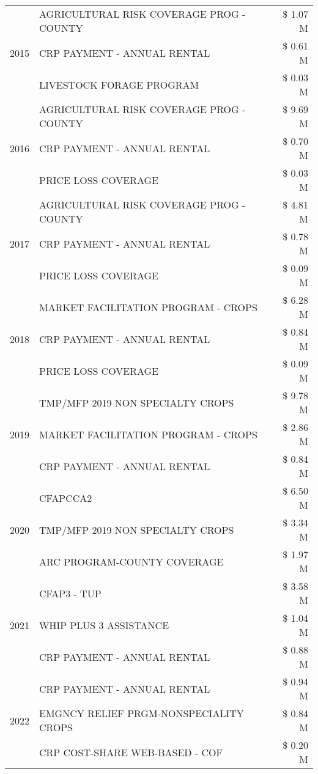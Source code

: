 \begin{tabular}{llr}
\multirow[t]{3}{*}{2015} & AGRICULTURAL RISK COVERAGE PROG - COUNTY & \$ 1.07 M \\
 & CRP PAYMENT - ANNUAL RENTAL & \$ 0.61 M \\
 & LIVESTOCK FORAGE PROGRAM & \$ 0.03 M \\
\cline{1-3}
\multirow[t]{3}{*}{2016} & AGRICULTURAL RISK COVERAGE PROG - COUNTY & \$ 9.69 M \\
 & CRP PAYMENT - ANNUAL RENTAL & \$ 0.70 M \\
 & PRICE LOSS COVERAGE & \$ 0.03 M \\
\cline{1-3}
\multirow[t]{3}{*}{2017} & AGRICULTURAL RISK COVERAGE PROG - COUNTY & \$ 4.81 M \\
 & CRP PAYMENT - ANNUAL RENTAL & \$ 0.78 M \\
 & PRICE LOSS COVERAGE & \$ 0.09 M \\
\cline{1-3}
\multirow[t]{3}{*}{2018} & MARKET FACILITATION PROGRAM - CROPS & \$ 6.28 M \\
 & CRP PAYMENT - ANNUAL RENTAL & \$ 0.84 M \\
 & PRICE LOSS COVERAGE & \$ 0.09 M \\
\cline{1-3}
\multirow[t]{3}{*}{2019} & TMP/MFP 2019 NON SPECIALTY CROPS & \$ 9.78 M \\
 & MARKET FACILITATION PROGRAM - CROPS & \$ 2.86 M \\
 & CRP PAYMENT - ANNUAL RENTAL & \$ 0.84 M \\
\cline{1-3}
\multirow[t]{3}{*}{2020} & CFAPCCA2 & \$ 6.50 M \\
 & TMP/MFP 2019 NON SPECIALTY CROPS & \$ 3.34 M \\
 & ARC PROGRAM-COUNTY COVERAGE & \$ 1.97 M \\
\cline{1-3}
\multirow[t]{3}{*}{2021} & CFAP3 - TUP & \$ 3.58 M \\
 & WHIP PLUS 3 ASSISTANCE & \$ 1.04 M \\
 & CRP PAYMENT - ANNUAL RENTAL & \$ 0.88 M \\
\cline{1-3}
\multirow[t]{3}{*}{2022} & CRP PAYMENT - ANNUAL RENTAL & \$ 0.94 M \\
 & EMGNCY RELIEF PRGM-NONSPECIALITY CROPS & \$ 0.84 M \\
 & CRP COST-SHARE WEB-BASED - COF & \$ 0.20 M \\
\cline{1-3}
\bottomrule
\end{tabular}
